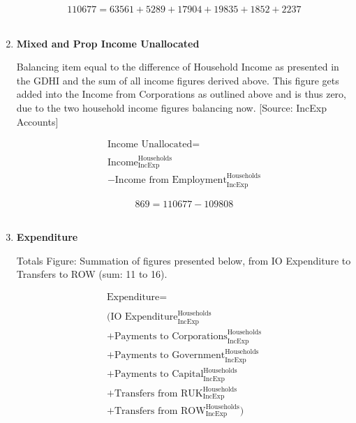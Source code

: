 \begin{enumerate}
\begin{equation} \nonumber
110677 = 63561+5289+17904+19835+1852+2237
\end{equation}\\


\item \textbf {Mixed and Prop Income Unallocated}

Balancing item equal to the difference of Household Income as presented in the GDHI and the sum of all income figures derived above. This figure gets added into the Income from Corporations as outlined above and is thus zero, due to the two household income figures balancing now. [Source: IncExp Accounts] \cite{ONS2011b}

\begin{equation}
\begin{split}
\text{Income Unallocated} =  \\ \\
\text{Income}^\text{Households}_\text{IncExp}\\
-\text{Income from Employment}^\text{Households}_\text{IncExp}
\end{split} \label{eq:2.5.13}
\end{equation}


\begin{equation} \nonumber
869 = 110677-109808
\end{equation}\\


\pagebreak

\item \textbf {Expenditure}

Totals Figure: Summation of figures presented below, from IO Expenditure to Transfers to ROW (sum: 11 to 16).

\begin{equation}
\begin{split}
\text{Expenditure} =  \\ \\
(\text{IO Expenditure}^\text{Households}_\text{IncExp}\\
+\text{Payments to Corporations}^\text{Households}_\text{IncExp}\\
+\text{Payments to Government}^\text{Households}_\text{IncExp}\\
+\text{Payments to Capital}^\text{Households}_\text{IncExp}\\
+\text{Transfers from RUK}^\text{Households}_\text{IncExp}\\
+\text{Transfers from ROW}^\text{Households}_\text{IncExp})
\end{split} \label{eq:2.5.14}
\end{equation}


\end{enumerate}
